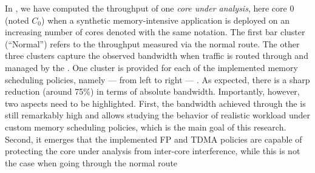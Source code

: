 In , we have computed the throughput of
one \emph{core under analysis}, here core 0 (noted $C_{0}$) when a
synthetic memory-intensive application is deployed on an increasing
number of cores denoted with the same notation. The first bar cluster
(``Normal'') refers to the throughput measured via the normal
route. The other three clusters capture the observed bandwidth when
traffic is routed through and managed by the \schim.
One cluster is provided for each of the implemented memory scheduling policies,
namely --- from left to right --- .
As expected, there is a sharp reduction (around 75\%) in terms of absolute
bandwidth. Importantly, however, two aspects need to be
highlighted. First, the bandwidth achieved through the \schim is still
remarkably high and allows studying the behavior of realistic workload
under custom memory scheduling policies, which is the main goal of
this research. Second, it emerges that the implemented FP and TDMA
policies are capable of protecting the core under analysis from
inter-core interference, while this is not the case when going through
the normal route




